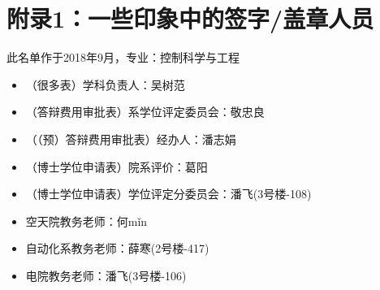\documentclass[a4paper, 12pt]{ctexart}
\begin{document}
\section*{\hypertarget{sec:appendix}{附录1}：一些印象中的签字/盖章人员}

此名单作于2018年9月，专业：控制科学与工程
\begin{itemize}
    \item （很多表）学科负责人：吴树范
    \item （答辩费用审批表）系学位评定委员会：敬忠良
    \item （（预）答辩费用审批表）经办人：潘志娟
    \item （博士学位申请表）院系评价：葛阳
    \item （博士学位申请表）学位评定分委员会：潘飞(3号楼-108)
    \item  空天院教务老师：何mǐn
    \item  自动化系教务老师：薛寒(2号楼-417)
    \item  电院教务老师：潘飞(3号楼-106)
\end{itemize}
\end{document}
